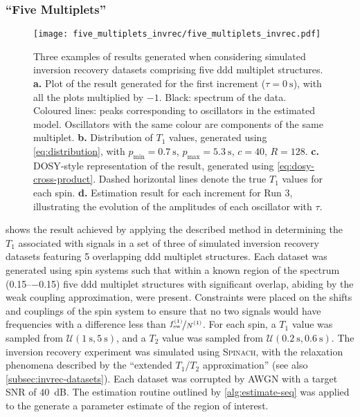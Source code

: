 \subsubsection{``Five Multiplets''}
\begin{figure}
    \texttt{[image: five\_multiplets\_invrec/five\_multiplets\_invrec.pdf]}
    \caption[
        Three examples of results generated wehn considering simulated
        inversion recovery datasets comprising five ddd multiplet structures.
    ]
    {
        Three examples of results generated when considering
        simulated inversion recovery datasets comprising five ddd multiplet
        structures.
        \textbf{a.} Plot of the result generated for the first increment ($\tau
        = \qty{0}{\second}$), with all the plots multiplied by $-1$. Black:
        spectrum of the data. Coloured lines: peaks corresponding to
        oscillators in the estimated model. Oscillators with the same colour
        are components of the same multiplet.
        \textbf{b.} Distribution of $T_1$ values, generated using
        \cref{eq:distribution}, with
        $p_{\text{min}} = \qty{0.7}{\second}$,
        $p_{\text{max}} = \qty{5.3}{\second}$,
        $c = 40$,
        $R=128$.
        \textbf{c.} \ac{DOSY}-style representation of the result, generated using
        \cref{eq:dosy-cross-product}.
        Dashed horizontal lines denote the true $T_1$ values for each spin.
        \textbf{d.} Estimation result for each increment for Run 3,
        illustrating the evolution of the amplitudes of each oscillator with
        $\tau$.
    }
    \label{fig:five-multiplets-invrec}
\end{figure}
 shows the result achieved by applying the
described method in determining the $T_1$ associated with signals in a set of
three of simulated inversion recovery datasets featuring 5 overlapping ddd
multiplet structures.
Each dataset was generated using spin systems such that within a
known region of the spectrum (\SIrange{0.15}{-0.15}{\partspermillion}) five ddd
multiplet structures with significant overlap, abiding by the weak coupling
approximation, were present.
Constraints were placed on the shifts and
couplings of the spin system to ensure that no two signals would have
frequencies with a difference less than $\nicefrac{\fswone}{\None}$.
For each spin, a $T_1$ value was sampled from $\mathcal{U}(\qty{1}{\second},
\qty{5}{\second})$, and a $T_2$ value was sampled from
$\mathcal{U}(\qty{0.2}{\second}, \qty{0.6}{\second})$.
The inversion recovery experiment was simulated using \textsc{Spinach}, with the
relaxation phenomena described by the ``extended $T_1$/$T_2$
approximation''\cite{SpinachRelax} (see also \cref{subsec:invrec-datasets}).
Each dataset was corrupted by \ac{AWGN} with a target \ac{SNR} of
\qty{40}{\deci\bel}.
The estimation routine outlined by \cref{alg:estimate-seq} was applied
to the generate a parameter estimate of the region of interest.

